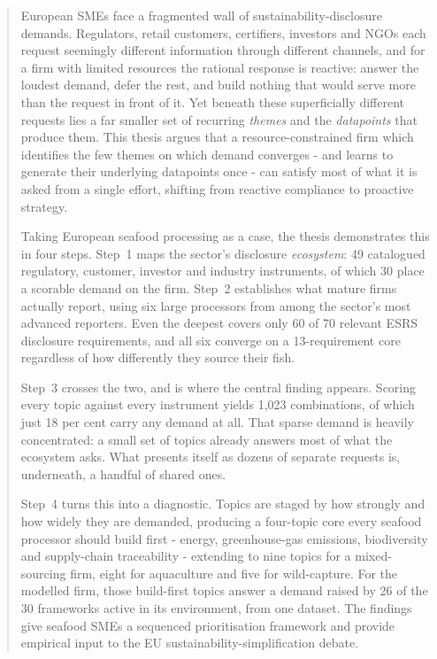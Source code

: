 \documentclass[
]{article}
\begin{document}
\clearpage

\begin{abstract}
\noindent
European SMEs face a fragmented wall of sustainability-disclosure demands.
Regulators, retail customers, certifiers, investors and NGOs each request
seemingly different information through different channels, and for a firm
with limited resources the rational response is reactive: answer the loudest
demand, defer the rest, and build nothing that would serve more than the
request in front of it. Yet beneath these superficially different requests
lies a far smaller set of recurring \emph{themes} and the \emph{datapoints}
that produce them. This thesis argues that a resource-constrained firm which
identifies the few themes on which demand converges - and learns to
generate their underlying datapoints once - can satisfy most of what it is
asked from a single effort, shifting from reactive compliance to proactive
strategy.


Taking European seafood processing as a case, the thesis demonstrates this in
four steps. Step~1 maps the sector's disclosure \emph{ecosystem}: 49 catalogued
regulatory, customer, investor and industry instruments, of which 30 place a
scorable demand on the firm. Step~2 establishes what mature firms actually
report, using six large processors from among the sector's most advanced reporters. Even
the deepest covers only 60 of 70 relevant ESRS disclosure requirements, and all
six converge on a 13-requirement core regardless of how differently they source
their fish.

Step~3 crosses the two, and is where the central finding appears. Scoring every
topic against every instrument yields 1{,}023 combinations, of which just 18 per cent
carry any demand at all. That sparse demand is heavily concentrated: a small set
of topics already answers most of what the ecosystem asks. What presents itself
as dozens of separate requests is, underneath, a handful of shared ones.

Step~4 turns this into a diagnostic. Topics are staged by how strongly and how
widely they are demanded, producing a four-topic core every seafood processor
should build first - energy, greenhouse-gas emissions, biodiversity and
supply-chain traceability - extending to nine topics for a mixed-sourcing firm,
eight for aquaculture and five for wild-capture. For the modelled firm, those
build-first topics answer a demand raised by 26 of the 30 frameworks active in
its environment, from one dataset. The findings give seafood SMEs a sequenced
prioritisation framework and provide empirical input to the EU
sustainability-simplification debate.
\end{abstract}
\end{document}
